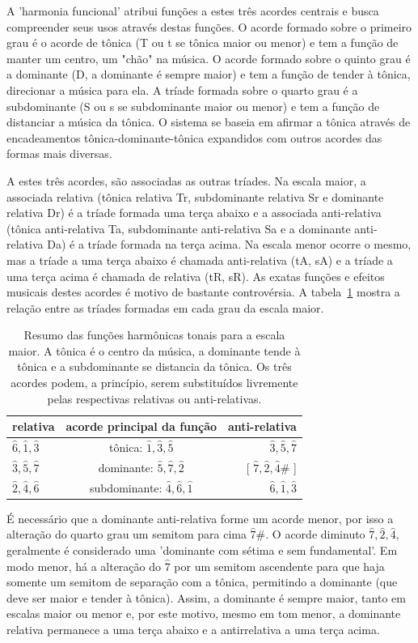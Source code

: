 A 'harmonia funcional' atribui funções a estes três acordes centrais e busca compreender seus usos através destas funções. O acorde formado sobre o primeiro grau é o acorde de tônica (T ou t se tônica maior ou menor) e tem a função de manter um centro, um "chão" na música. O acorde formado sobre o quinto grau é a dominante (D, a dominante é sempre maior) e tem a função de tender à tônica, direcionar a música para ela. A tríade formada sobre o quarto grau é a subdominante (S ou s se subdominante maior ou menor) e tem a função de distanciar a música da tônica. O sistema se baseia em afirmar a tônica através de encadeamentos tônica-dominante-tônica expandidos com outros acordes das formas mais diversas.

A estes três acordes, são associadas as outras tríades. Na escala maior, a associada relativa (tônica relativa Tr, subdominante relativa Sr e dominante relativa Dr) é a tríade formada uma terça abaixo e a associada anti-relativa (tônica anti-relativa Ta, subdominante anti-relativa Sa e a dominante anti-relativa Da) é a tríade formada na terça acima. Na escala menor ocorre o mesmo, mas a tríade a uma terça abaixo é chamada anti-relativa (tA, sA) e a tríade a uma terça acima é chamada de relativa (tR, sR). As exatas funções e efeitos musicais destes acordes é motivo de bastante controvérsia. A tabela~\ref{tab:harmonia} mostra a relação entre as tríades formadas em cada grau da escala maior.

\begin{table}[htpq!]
\centering
\caption{Resumo das funções harmônicas tonais para a escala maior. A tônica é o centro da música, a dominante tende à tônica e a subdominante se distancia da tônica. Os três acordes podem, a princípio, serem substituídos livremente pelas respectivas relativas ou anti-relativas.}
\begin{tabular}{l | c | r}
relativa & acorde principal da função & anti-relativa \\\hline\hline
$\hat{6},\hat{1},\hat{3}$ & tônica:       $\hat{1},\hat{3},\hat{5}$ & $\hat{3}, \hat{5},      \hat{7}$ \\
$\hat{3},\hat{5},\hat{7}$ & dominante:    $\hat{5},\hat{7},\hat{2}$ & [ $\hat{7},\hat{2},\hat{4}\#$ ] \\
$\hat{2},\hat{4},\hat{6}$ & subdominante: $\hat{4},\hat{6},\hat{1}$ & $\hat{6},\hat{1},       \hat{3}$
\end{tabular}
\label{tab:harmonia}
\end{table}

É necessário que a dominante anti-relativa forme um acorde menor, por isso a alteração do quarto grau um semitom para cima $\hat{7}\#$. O acorde diminuto $\hat{7},\hat{2},\hat{4}$, geralmente é considerado uma 'dominante com sétima e sem fundamental'.\cite{Koellheuteur}
Em modo
menor, há a alteração do $\hat{7}$ por um semitom ascendente para que haja somente um semitom de separação com a tônica,
permitindo a dominante (que deve ser maior e tender à tônica). Assim, a dominante é sempre maior, tanto em escalas maior ou menor e, por este motivo, mesmo em tom menor, a dominante relativa permanece a uma terça abaixo e a antirrelativa a uma terça acima.

